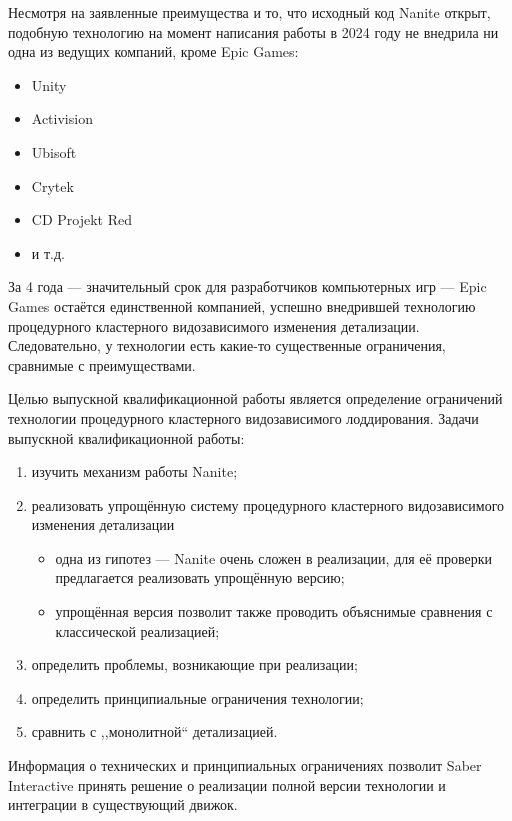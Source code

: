 Несмотря на заявленные преимущества и то, что исходный код Nanite открыт, подобную технологию на момент написания работы в 2024 году не внедрила ни одна из ведущих компаний, кроме Epic Games:
\begin{itemize}
    \item Unity
    \item Activision
    \item Ubisoft
    \item Crytek
    \item CD Projekt Red
    \item и т.д.
\end{itemize}
За 4 года --- значительный срок для разработчиков компьютерных игр --- Epic Games остаётся единственной компанией, успешно внедрившей технологию процедурного кластерного видозависимого изменения детализации.
Следовательно, у технологии есть какие-то существенные ограничения, сравнимые с преимуществами.

Целью выпускной квалификационной работы является определение ограничений технологии процедурного кластерного видозависимого лоддирования.
Задачи выпускной квалификационной работы:
\begin{enumerate}
    \item изучить механизм работы Nanite;
    \item реализовать упрощённую систему процедурного кластерного видозависимого изменения детализации
    \begin{itemize}
        \item одна из гипотез --- Nanite очень сложен в реализации, для её проверки предлагается реализовать упрощённую версию;
        \item упрощённая версия позволит также проводить объяснимые сравнения с классической реализацией;
    \end{itemize}
    \item определить проблемы, возникающие при реализации;
    \item определить принципиальные ограничения технологии;
    \item сравнить с ,,монолитной`` детализацией.
\end{enumerate}

Информация о технических и принципиальных ограничениях позволит Saber Interactive принять решение о реализации полной версии технологии и интеграции в существующий движок.
